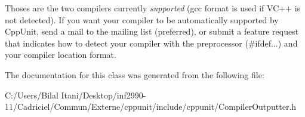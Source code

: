 Thoses are the two compilers currently {\itshape supported} (gcc format is used if V\+C++ is not detected). If you want your compiler to be automatically supported by Cpp\+Unit, send a mail to the mailing list (preferred), or submit a feature request that indicates how to detect your compiler with the preprocessor (\#ifdef...) and your compiler location format. 

The documentation for this class was generated from the following file\+:\begin{DoxyCompactItemize}
\item 
C\+:/\+Users/\+Bilal Itani/\+Desktop/inf2990-\/11/\+Cadriciel/\+Commun/\+Externe/cppunit/include/cppunit/Compiler\+Outputter.\+h\end{DoxyCompactItemize}
